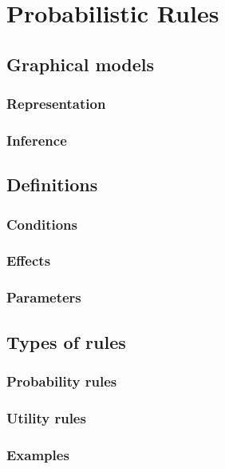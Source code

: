 \chapter{Probabilistic Rules}
\label{chap:rules}

\section{Graphical models}

\subsection{Representation}

\subsection{Inference}

\section{Definitions}

\subsection{Conditions}

\subsection{Effects}

\subsection{Parameters}

\section{Types of rules}

\subsection{Probability rules}

\subsection{Utility rules}

\subsection{Examples}

